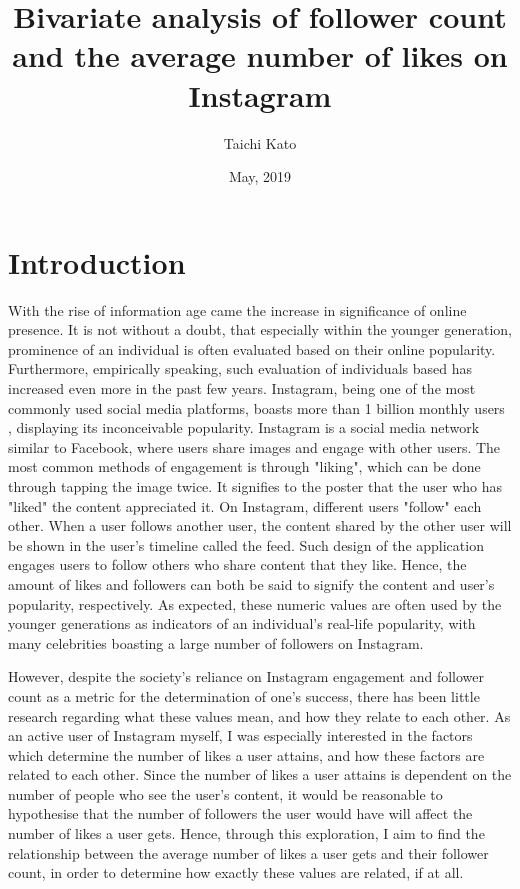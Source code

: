 \documentclass[11pt]{article}
\title{Bivariate analysis of follower count and the average number of likes on Instagram}
\author{Taichi Kato}
\date{May, 2019}
\begin{document}
\maketitle

\begin{abstract}
\textit{
}
\end{abstract}

\section{Introduction}\label{section-introduction}

\quad\quad With the rise of information age came the increase in significance of online presence. 
It is not without a doubt, that especially within the younger generation, prominence of an individual is often evaluated based on their online popularity. 
Furthermore, empirically speaking, such evaluation of individuals based has increased even more in the past few years.
Instagram, being one of the most commonly used social media platforms, boasts more than 1 billion monthly users \cite{techcrunch:online}, displaying its inconceivable popularity.
Instagram is a social media network similar to Facebook, where users share images and engage with other users.
The most common methods of engagement is through "liking", which can be done through tapping the image twice.
It signifies to the poster that the user who has "liked" the content appreciated it.
On Instagram, different users "follow" each other.
When a user follows another user, the content shared by the other user will be shown in the user's timeline called the feed.
Such design of the application engages users to follow others who share content that they like.
Hence, the amount of likes and followers can both be said to signify the content and user's popularity, respectively.
As expected, these numeric values are often used by the younger generations as indicators of an individual's real-life popularity, with many celebrities boasting a large number of followers on Instagram.

However, despite the society's reliance on Instagram engagement and follower count as a metric for the determination of one's success, there has been little research regarding what these values mean, and how they relate to each other.
As an active user of Instagram myself, I was especially interested in the factors which determine the number of likes a user attains, and how these factors are related to each other.
Since the number of likes a user attains is dependent on the number of people who see the user's content, it would be reasonable to hypothesise that the number of followers the user would have will affect the number of likes a user gets. 
Hence, through this exploration, I aim to find the relationship between the average number of likes a user gets and their follower count, in order to determine how exactly these values are related, if at all.
\end{document}
